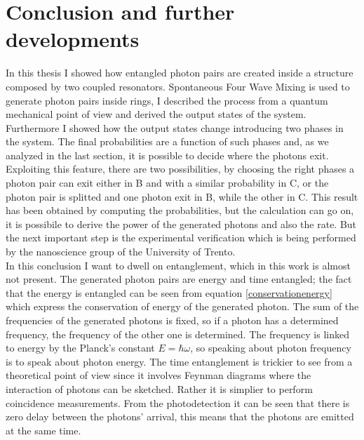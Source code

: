 \chapter{Conclusion and further developments}
In this thesis I showed how entangled photon pairs are created inside a structure composed by two coupled resonators. Spontaneous Four Wave Mixing is used to generate photon pairs inside rings, I described the process from a quantum mechanical point of view and derived the output states of the system. Furthermore I showed how the output states change introducing two phases in the system. The final probabilities are a function of such phases and, as we analyzed in the last section, it is possible to decide where the photons exit. Exploiting this feature, there are two possibilities, by choosing the right phases a photon pair can exit either in B and with a similar probability in C, or the photon pair is splitted and one photon exit in B, while the other in C. This result has been obtained by computing the probabilities, but the calculation can go on, it is possibile to derive the power of the generated photons and also the rate. But the next important step is the experimental verification which is being performed by the nanoscience group of the University of Trento.\\
In this conclusion I want to dwell on entanglement, which in this work is almost not present. The generated photon pairs are energy and time entangled; the fact that the energy is entangled can be seen from equation \eqref{conservationenergy} which express the conservation of energy of the generated photon. The sum of the frequencies of the generated photons is fixed, so if a photon has a determined frequency, the frequency of the other one is determined. The frequency is linked to energy by the Planck's constant $E = \hbar \omega$, so speaking about photon frequency is to speak about photon energy. The time entanglement is trickier to see from a theoretical point of view since it involves Feynman diagrams where the interaction of photons can be sketched. Rather it is simplier to perform coincidence measurements. From the photodetection it can be seen that there is zero delay between the photons' arrival, this means that the photons are emitted at the same time.